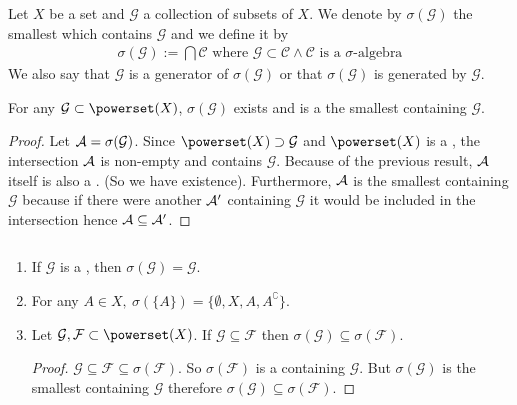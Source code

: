 \newcommand{\calG}{\mathcal{G}}
\newcommand{\calF}{\mathcal{F}}
\newcommand{\calC}{\mathcal{C}}
\begin{dfn}
	Let $X$ be a set and $\calG$ a collection of subsets of $X$. We denote by $\sigma(\calG)$ the smallest \siga which contains $\calG$ and we define it by
	\begin{align*}
		\sigma(\calG) := \bigcap \calC\text{ where } \calG \subset \calC \land \calC \text{ is a } \sigma\text{-algebra}
	\end{align*}
	We also say that $\calG$ is a generator of $\sigma(\calG)$ or that $\sigma(\calG)$ is generated by $\calG$.
\end{dfn}

\begin{thm}
	For any $\calG \subset \powerset(X)$, $\sigma (\calG)$ exists and is a the smallest \siga containing $\calG$.
\end{thm}

\begin{proof}
	Let $\sa = \sigma(\calG)$. Since $\powerset(X) \supset \calG$ and $\powerset(X)$ is a \siga, the intersection $\mathcal{A}$ is non-empty and contains $\calG$. Because of the previous result, $\mathcal{A}$ itself is also a \siga. (So we have existence). Furthermore, $\mathcal{A}$ is the smallest \siga containing $\calG$ because if there were another \siga $\mathcal{A}'$ containing $\calG$ it would be included in the intersection hence $\mathcal{A} \subseteq \mathcal{A}'$.
\end{proof}

\begin{remark}
	\label{rem:generators}
	$ $\newline
	\begin{enumerate}
		\item If $\calG$ is a \siga, then $\sigma(\calG) = \calG$.
		\item For any $A \in X,\ \sigma(\{A\}) = \{\emptyset, X, A, A^\complement\}$.
		\item Let $\calG, \mathcal{F} \subset \powerset(X)$. If $\calG \subseteq \mathcal{F}$ then $\sigma (\calG) \subseteq \sigma(\mathcal{F})$.
		\begin{proof}
			$\calG \subseteq \mathcal{F} \subseteq \sigma(\mathcal{F})$. So $\sigma(\mathcal{F})$ is a \siga containing $\calG$. But $\sigma(\mathcal{G})$ is the smallest \siga containing $\calG$ therefore $\sigma(\calG) \subseteq \sigma(\mathcal{F})$.
		\end{proof}
	\end{enumerate}
\end{remark}

